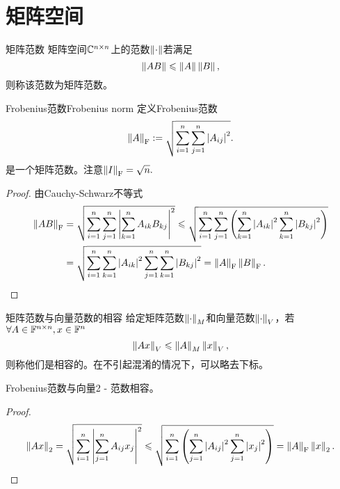 \section{矩阵空间}
\label{sec:matrix space}

\begin{definition}
    {矩阵范数}{}
    矩阵空间$\mathbb C^{n\times n}$上的范数$\left\lVert\cdot\right\rVert$若满足
    \begin{equation}
        \left\lVert AB\right\rVert\leqslant\left\lVert A\right\rVert\left\lVert B\right\rVert,
    \end{equation}
    则称该范数为矩阵范数。
\end{definition}

\newcommand{\Forb}[1]{\norm{#1}_{\mathrm F}}


\begin{example}
    {Frobenius范数}{Frobenius norm}
    定义Frobenius范数
    \begin{equation}
        \Forb A:=\sqrt{\sum_{i=1}^n\sum_{j=1}^n\abs{A_{ij}}^2}.
    \end{equation}
    是一个矩阵范数。注意$\Forb I=\sqrt n.$
    \begin{proof}
        由Cauchy-Schwarz不等式
        \begin{align*}
            \Forb{AB}&=\sqrt{\sum_{i=1}^n\sum_{j=1}^n\abs{\sum_{k=1}^nA_{ik}B_{kj}}^2}\leq\sqrt{\sum_{i=1}^n\sum_{j=1}^n\kh{\sum_{k=1}^n\abs{A_{ik}}^2\sum_{k=1}^n\abs{B_{kj}}^2}}\\
            &=\sqrt{\sum_{i=1}^n\sum_{k=1}^n\abs{A_{ik}}^2\sum_{j=1}^n\sum_{k=1}^n\abs{B_{kj}}^2}=\Forb A\Forb B.
            \qedhere
        \end{align*}
    \end{proof}
\end{example}

\begin{definition}
    {矩阵范数与向量范数的相容}{}
    给定矩阵范数$\left\lVert\cdot\right\rVert_M$和向量范数$\left\lVert\cdot\right\rVert_V$，若$\forall A\in\mathbb F^{n\times n},x\in\mathbb F^n$ 
    \begin{equation}
        \left\lVert Ax\right\rVert_V\leqslant\left\lVert A\right\rVert_M\left\lVert x\right\rVert_V,
    \end{equation}
    则称他们是相容的。在不引起混淆的情况下，可以略去下标。
\end{definition}

\begin{example}
    {}{}
    Frobenius范数与向量2 - 范数相容。
    \begin{proof}
        \[
            \norm{Ax}_2=\sqrt{\sum_{i=1}^n\abs{\sum_{j=1}^n A_{ij}x_j}^2}\leq\sqrt{\sum_{i=1}^n\kh{\sum_{j=1}^n\abs{A_{ij}}^2\sum_{j=1}^n\abs{x_j}^2}}=\Forb A\norm x_2.
            \qedhere
        \]
    \end{proof}
\end{example}

